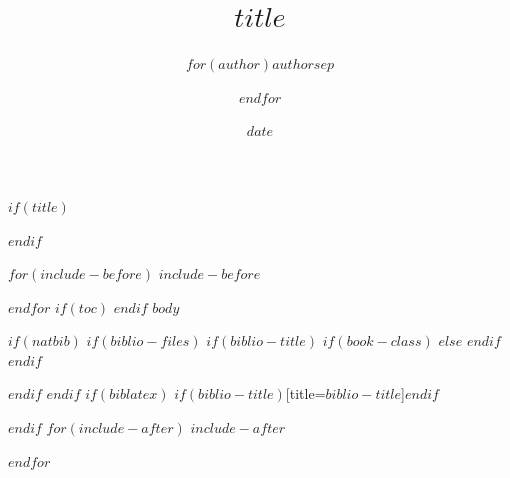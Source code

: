 \documentclass[$if(fontsize)$$fontsize$,$endif$$if(lang)$$lang$,$endif$]{$documentclass$}
\title{$title$}
\author{$for(author)$$author$$sep$ \and $endfor$}
\date{$date$}
\begin{document}
$if(title)$
\maketitle
$endif$

$for(include-before)$
$include-before$

$endfor$
$if(toc)$
{
\hypersetup{linkcolor=black}
\setcounter{tocdepth}{$toc-depth$}
\tableofcontents
}
$endif$
$body$

$if(natbib)$
$if(biblio-files)$
$if(biblio-title)$
$if(book-class)$
\renewcommand\bibname{$biblio-title$}
$else$
\renewcommand\refname{$biblio-title$}
$endif$
$endif$


$endif$
$endif$
$if(biblatex)$
\printbibliography$if(biblio-title)$[title=$biblio-title$]$endif$

$endif$
$for(include-after)$
$include-after$

$endfor$
\end{document}
